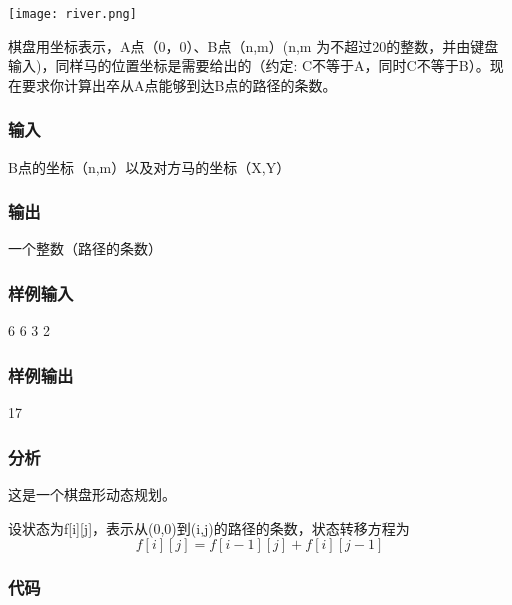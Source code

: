 \begin{center}
\texttt{[image: river.png]}\\
\label{fig:river}
\end{center}

棋盘用坐标表示，A点（0，0）、B点（n,m）(n,m 为不超过20的整数，并由键盘输入)，同样马的位置坐标是需要给出的（约定: C不等于A，同时C不等于B）。现在要求你计算出卒从A点能够到达B点的路径的条数。

\subsubsection{输入}
B点的坐标（n,m）以及对方马的坐标（X,Y）

\subsubsection{输出}
一个整数（路径的条数）

\subsubsection{样例输入}
\begin{Code}
6 6 3 2
\end{Code}

\subsubsection{样例输出}
\begin{Code}
17
\end{Code}

\subsubsection{分析}
这是一个棋盘形动态规划。

设状态为f[i][j]，表示从(0,0)到(i,j)的路径的条数，状态转移方程为
$$
f[i][j] = f[i-1][j] + f[i][j-1]
$$

\subsubsection{代码}

